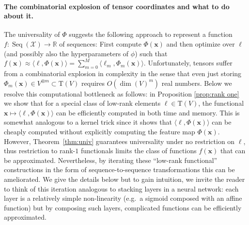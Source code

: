 \documentclass{article} \usepackage{iclr2021_conference,times}
\newcommand{\R}{\mathbb{R}}
\newcommand{\bx}{\mathbf{x}}
\newcommand{\cX}{\mathcal{X}}
\newcommand{\T}[1]{\mathrm{T}({#1})}
\newcommand{\Seq}[1]{\operatorname{Seq}(#1)}
\theoremstyle{plain}
\theoremstyle{definition}
\begin{document}
\paragraph{The combinatorial explosion of tensor coordinates and what to do about it.}
The universality of $\Phi$ suggests the following approach to represent a function $f:\Seq{\cX} \to \R$ of sequences: First compute $\Phi(\bx)$ and then optimize over $\ell$ (and possibly also the hyperparameters of $\phi$) such that $f(\bx) \approx \langle \ell, \Phi(\bx) \rangle=\sum_{m=0}^M \langle \ell_m, \Phi_m(\bx) \rangle$.   
Unfortunately, tensors suffer from a combinatorial explosion in complexity in the sense that even just storing $ \Phi_m(\bx) \in  V^{\otimes m} \subset \T{V} $ requires $O(\operatorname{dim}(V)^{m})$ real numbers.
Below we resolve this computational bottleneck as follows: in Proposition \ref{prop:rank one} we show that for a special class of low-rank elements $\ell \in \T{V}$, the functional $\bx \mapsto \langle \ell, \Phi(\bx) \rangle$ can be efficiently computed in both time and memory.
This is somewhat analogous to a kernel trick since it shows that $\langle \ell, \Phi(\bx) \rangle$ can be cheaply computed without explicitly computing the feature map $\Phi(\bx)$. 
However, Theorem~\ref{thm:univ} guarantees universality under no restriction on $\ell$, thus restriction to rank-$1$ functionals limits the class of functions $f(\bx)$ that can be approximated.
Nevertheless, by iterating these ``low-rank functional'' constructions in the form of sequence-to-sequence transformations this can be ameliorated.
We give the details below but to gain intuition, we invite the reader to think of this iteration analogous to stacking layers in a neural network: each layer is a relatively simple non-linearity (e.g.~a sigmoid composed with an affine function) but by composing such layers, complicated functions can be efficiently approximated.
\end{document}
